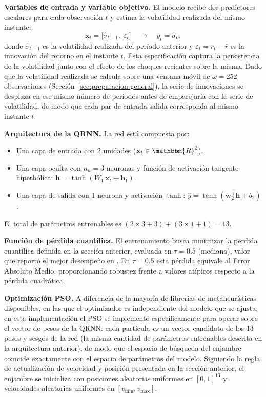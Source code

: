 \documentclass[12pt]{paper}
\begin{document}
\textbf{Variables de entrada y variable objetivo.} El modelo recibe dos predictores escalares para cada observación $t$ y estima la volatilidad realizada del mismo instante:
\begin{equation}
    \mathbf{x}_t = \bigl[\hat{\sigma}_{t-1},\;\varepsilon_t\bigr] \quad \longrightarrow \quad y_t = \hat{\sigma}_t,
\end{equation}
donde $\hat{\sigma}_{t-1}$ es la volatilidad realizada del período anterior y $\varepsilon_t = r_t - \bar{r}$ es la innovación del retorno en el instante $t$. Esta especificación captura la persistencia de la volatilidad junto con el efecto de los choques recientes sobre la misma. Dado que la volatilidad realizada se calcula sobre una ventana móvil de $\omega = 252$ observaciones (Sección~\ref{sec:preparacion-general}), la serie de innovaciones se desplaza en ese mismo número de períodos antes de emparejarla con la serie de volatilidad, de modo que cada par de entrada-salida corresponda al mismo instante $t$.

\textbf{Arquitectura de la QRNN.} La red está compuesta por:
\begin{itemize}
    \item Una capa de entrada con 2 unidades ($\mathbf{x}_t \in \mathbbm{R}^2$).
    \item Una capa oculta con $n_h = 3$ neuronas y función de activación tangente hiperbólica: $\mathbf{h} = \tanh(W_1\,\mathbf{x}_t + \mathbf{b}_1)$.
    \item Una capa de salida con 1 neurona y activación $\tanh$: $\hat{y} = \tanh(\mathbf{w}_2^{\top}\mathbf{h} + b_2)$.
\end{itemize}
El total de parámetros entrenables es $(2 \times 3 + 3) + (3 \times 1 + 1) = 13$.

\textbf{Función de pérdida cuantílica.} El entrenamiento busca minimizar la pérdida cuantílica definida en la sección anterior, evaluada en $\tau = 0.5$ (mediana), valor que reportó el mejor desempeño en \citet{pradeepkumar2017forecasting}. En $\tau = 0.5$ esta pérdida equivale al Error Absoluto Medio, proporcionando robustez frente a valores atípicos respecto a la pérdida cuadrática.

\textbf{Optimización PSO.} A diferencia de la mayoría de librerías de metaheurísticas disponibles, en las que el optimizador es independiente del modelo que se ajusta, en esta implementación el PSO se implementó específicamente para operar sobre el vector de pesos de la QRNN: cada partícula \emph{es} un vector candidato de los 13 pesos y sesgos de la red (la misma cantidad de parámetros entrenables descrita en la arquitectura anterior), de modo que el espacio de búsqueda del enjambre coincide exactamente con el espacio de parámetros del modelo. Siguiendo la regla de actualización de velocidad y posición presentada en la sección anterior, el enjambre se inicializa con posiciones aleatorias uniformes en $[0,1]^{13}$ y velocidades aleatorias uniformes en $[v_{\min}, v_{\max}]$.
\end{document}
